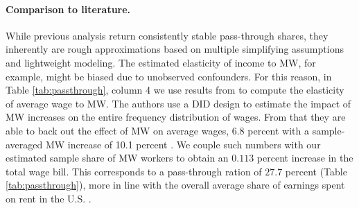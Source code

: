 \paragraph{Comparison to literature.} While previous analysis return consistently stable 
pass-through shares, they inherently are rough approximations based on multiple simplifying 
assumptions and lightweight modeling. The estimated elasticity of income to MW, for example, 
might be biased due to unobserved confounders. For this reason, in Table \ref{tab:passthrough}, 
column 4 we use results from \textcite{cengiz2019effect} to compute the elasticity of 
average wage to MW. The authors use a DID design to estimate the impact of MW increases 
on the entire frequency distribution of wages. From that they are able to back out the effect of 
MW on average wages, 6.8 percent with a sample-averaged MW increase of 10.1 percent 
\parencite[Table I]{cengiz2019effect}. We couple such numbers with our estimated sample share 
of MW workers to obtain an $0.113$ percent increase in the total wage bill. This corresponds to 
a pass-through ration of $27.7$ percent (Table \ref{tab:passthrough}), more in line with the 
overall average share of earnings spent on rent in the U.S. \parencite{fernald2020americas}.   

\begin{table}[!h] 
	\centering
	\caption{Pass-Through of MW policies to Rent}
	\label{tab:passthrough}    
	{
		\def\sym#1{\ifmmode^{#1}\else\(^{#1}\)\fi}
	}
\end{table}

